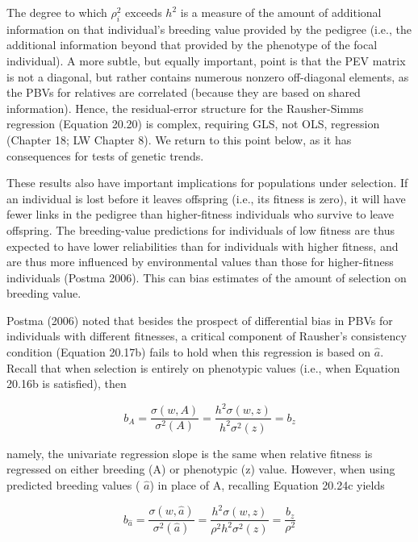 \documentclass{article}
\begin{document}
The degree to which  $ \rho_i^2 $ exceeds  $ h^2 $ is a measure of the amount of additional information on that individual's breeding value provided by the pedigree (i.e., the additional information beyond that provided by the phenotype of the focal individual). A more subtle, but equally important, point is that the PEV matrix is not a diagonal, but rather contains numerous nonzero off-diagonal elements, as the PBVs for relatives are correlated (because they are based on shared information). Hence, the residual-error structure for the Rausher-Simms regression (Equation 20.20) is complex, requiring GLS, not OLS, regression (Chapter 18; LW Chapter 8). We return to this point below, as it has consequences for tests of genetic trends.

These results also have important implications for populations under selection. If an individual is lost before it leaves offspring (i.e., its fitness is zero), it will have fewer links in the pedigree than higher-fitness individuals who survive to leave offspring. The breeding-value predictions for individuals of low fitness are thus expected to have lower reliabilities than for individuals with higher fitness, and are thus more influenced by environmental values than those for higher-fitness individuals (Postma 2006). This can bias estimates of the amount of selection on breeding value.

Postma (2006) noted that besides the prospect of differential bias in PBVs for individuals with different fitnesses, a critical component of Rausher's consistency condition (Equation 20.17b) fails to hold when this regression is based on  $ \hat{a} $. Recall that when selection is entirely on phenotypic values (i.e., when Equation 20.16b is satisfied), then

\begin{equation}
b_{A}=\frac{\sigma(w,A)}{\sigma^{2}(A)}=\frac{h^{2}\sigma(w,z)}{h^{2}\sigma^{2}(z)}=b_{z}
\tag{20.25a}
\label{eq:20_25a}
\end{equation}

namely, the univariate regression slope is the same when relative fitness is regressed on either breeding (A) or phenotypic (z) value. However, when using predicted breeding values ( $ \widehat{a} $) in place of A, recalling Equation 20.24c yields

\begin{equation}
b_{\hat{a}}=\frac{\sigma(w,\widehat{a})}{\sigma^{2}(\widehat{a})}=\frac{h^{2}\sigma(w,z)}{\rho^{2}h^{2}\sigma^{2}(z)}=\frac{b_{z}}{\rho^{2}}
\tag{20.25b}
\label{eq:20_25b}
\end{equation}
\end{document}
